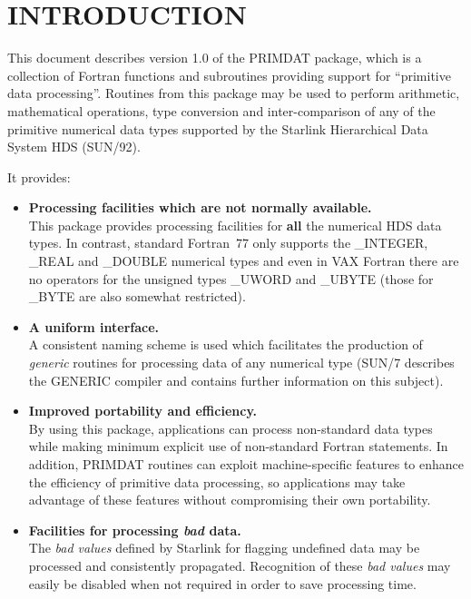 \documentclass[11pt,nolof]{starlink}
\providecommand{\name}[1]{\mbox{#1}}
\begin{document}
\scfrontmatter

\section{INTRODUCTION}

This document describes version 1.0 of the \name{PRIMDAT} package, which
is a collection of Fortran functions and subroutines providing support for
``primitive data processing''.
Routines from this package may be used to perform arithmetic, mathematical
operations, type conversion and inter-comparison of any of the primitive
numerical data types supported by the Starlink Hierarchical Data System HDS
(SUN/92).

It provides:

\begin{itemize}

\item \textbf{Processing facilities which are not normally available.}\\
This package provides processing facilities for \textbf{all} the numerical
\name{HDS} data types.  In contrast, standard Fortran~77 only supports the
\name{\_INTEGER}, \name{\_REAL} and \name{\_DOUBLE} numerical types  and
even in \name{VAX} Fortran there are no operators for the unsigned types
\name{\_UWORD} and \name{\_UBYTE} (those for \name{\_BYTE} are also
somewhat restricted).

\item \textbf{A uniform interface.}\\
A consistent naming scheme is used which facilitates the production of \emph{generic} routines for processing data of any numerical type (\name{SUN/7}
describes the \name{GENERIC} compiler and contains further information on
this subject).

\item \textbf{Improved portability and efficiency.}\\
By using this package, applications can process non-standard data types
while making minimum explicit use of non-standard Fortran statements.
In addition, \name{PRIMDAT} routines can exploit machine-specific features
to enhance the efficiency of primitive data processing, so applications may
take advantage of these features without compromising their own portability.

\item \textbf{Facilities for processing \emph{bad} data.}\\
The \emph{bad values} defined by Starlink for flagging undefined data
may be processed and consistently propagated.
Recognition of these \emph{bad values} may easily be disabled when not
required in order to save processing time.


\end{itemize}
\end{document}
